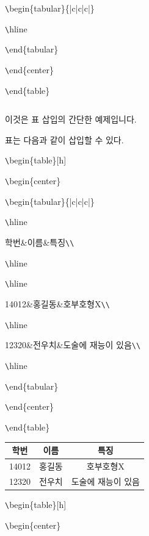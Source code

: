 \documentclass[11pt]{article}
\begin{document}
\verb+\+begin\{tabular\}\{|c|c|c|\}

\verb+\+hline

\verb+\+end\{tabular\}

\verb+\+end\{center\}

\verb+\+end\{table\}


\begin{table}[h]
	\begin{center}
		\begin{tabular}{|c|c|c|}
			\hline
		\end{tabular}
	\end{center}
\end{table}

이것은 표 삽입의 간단한 예제입니다.

표는 다음과 같이 삽입할 수 있다.

\verb+\+begin\{table\}[h]

\verb+\+begin\{center\}

\verb+\+begin\{tabular\}\{|c|c|c|\}

\verb+\+hline

학번\&이름\&특징\verb+\+\verb+\+

\verb+\+hline

\verb+\+hline

14012\&홍길동\&호부호형X\verb+\+\verb+\+

\verb+\+hline

12320\&전우치\&도술에 재능이 있음\verb+\+\verb+\+

\verb+\+hline

\verb+\+end\{tabular\}

\verb+\+end\{center\}

\verb+\+end\{table\}


\begin{table}[h]
	\begin{center}
		\begin{tabular}{|c|c|c|}
			\hline
			학번&이름&특징\\
			\hline
			\hline
			14012&홍길동&호부호형X\\
			\hline
			12320&전우치&도술에 재능이 있음\\
			\hline
		\end{tabular}
	\end{center}
\end{table}

\longline

\verb+\+begin\{table\}[h]

\verb+\+begin\{center\}
\end{document}
